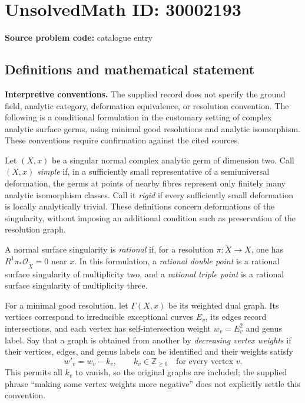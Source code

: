 \documentclass[11pt]{article}
\newcommand{\Z}{\mathbb{Z}}
\begin{document}
\section*{UnsolvedMath ID: 30002193}
\textbf{Source problem code:} catalogue entry
\subsection{Definitions and mathematical statement}
\textbf{Interpretive conventions.} The supplied record does not specify the ground field, analytic category, deformation equivalence, or resolution convention. The following is a conditional formulation in the customary setting of complex analytic surface germs, using minimal good resolutions and analytic isomorphism. These conventions require confirmation against the cited sources.

Let $(X,x)$ be a singular normal complex analytic germ of dimension two. Call $(X,x)$ \emph{simple} if, in a sufficiently small representative of a semiuniversal deformation, the germs at points of nearby fibres represent only finitely many analytic isomorphism classes. Call it \emph{rigid} if every sufficiently small deformation is locally analytically trivial. These definitions concern deformations of the singularity, without imposing an additional condition such as preservation of the resolution graph.

A normal surface singularity is \emph{rational} if, for a resolution $\pi:\widetilde X\to X$, one has $R^1\pi_*\mathcal O_{\widetilde X}=0$ near $x$. In this formulation, a \emph{rational double point} is a rational surface singularity of multiplicity two, and a \emph{rational triple point} is a rational surface singularity of multiplicity three.

For a minimal good resolution, let $\Gamma(X,x)$ be its weighted dual graph. Its vertices correspond to irreducible exceptional curves $E_v$, its edges record intersections, and each vertex has self-intersection weight $w_v=E_v^2$ and genus label. Say that a graph is obtained from another by \emph{decreasing vertex weights} if their vertices, edges, and genus labels can be identified and their weights satisfy
\[
 w'_v=w_v-k_v,\qquad k_v\in\Z_{\geq 0}
 \quad\text{for every vertex }v.
\]
This permits all $k_v$ to vanish, so the original graphs are included; the supplied phrase ``making some vertex weights more negative'' does not explicitly settle this convention.
\end{document}
